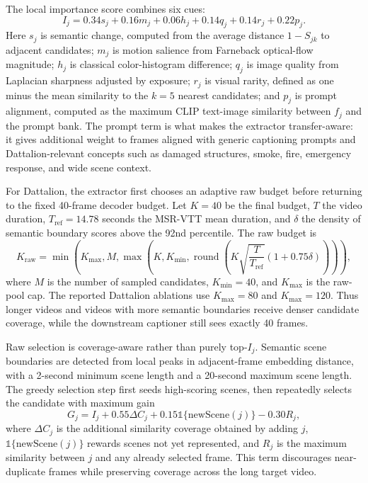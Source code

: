 \documentclass[pdflatex,sn-mathphys-num]{sn-jnl}
\theoremstyle{thmstyleone}
\theoremstyle{thmstyletwo}
\theoremstyle{thmstylethree}
\begin{document}
The local importance score combines six cues:
\[
    I_j =
    0.34s_j + 0.16m_j + 0.06h_j
    + 0.14q_j + 0.14r_j + 0.22p_j .
\]
Here $s_j$ is semantic change, computed from the average distance $1-S_{jk}$ to adjacent candidates; $m_j$ is motion salience from Farneback optical-flow magnitude; $h_j$ is classical color-histogram difference; $q_j$ is image quality from Laplacian sharpness adjusted by exposure; $r_j$ is visual rarity, defined as one minus the mean similarity to the $k=5$ nearest candidates; and $p_j$ is prompt alignment, computed as the maximum CLIP text-image similarity between $f_j$ and the prompt bank. The prompt term is what makes the extractor transfer-aware: it gives additional weight to frames aligned with generic captioning prompts and Dattalion-relevant concepts such as damaged structures, smoke, fire, emergency response, and wide scene context.

For Dattalion, the extractor first chooses an adaptive raw budget before returning to the fixed 40-frame decoder budget. Let $K=40$ be the final budget, $T$ the video duration, $T_{\mathrm{ref}}=14.78$ seconds the MSR-VTT mean duration, and $\delta$ the density of semantic boundary scores above the 92nd percentile. The raw budget is
\[
    K_{\mathrm{raw}} =
    \min\left(
        K_{\max}, M,
        \max\left(K, K_{\min},
        \operatorname{round}\left(K\sqrt{\frac{T}{T_{\mathrm{ref}}}}
        \left(1+0.75\delta\right)\right)\right)
    \right),
\]
where $M$ is the number of sampled candidates, $K_{\min}=40$, and $K_{\max}$ is the raw-pool cap. The reported Dattalion ablations use $K_{\max}=80$ and $K_{\max}=120$. Thus longer videos and videos with more semantic boundaries receive denser candidate coverage, while the downstream captioner still sees exactly 40 frames.

Raw selection is coverage-aware rather than purely top-$I_j$. Semantic scene boundaries are detected from local peaks in adjacent-frame embedding distance, with a 2-second minimum scene length and a 20-second maximum scene length. The greedy selection step first seeds high-scoring scenes, then repeatedly selects the candidate with maximum gain
\[
    G_j =
    I_j + 0.55\Delta C_j + 0.15\mathbb{1}\{\mathrm{newScene}(j)\}
    -0.30R_j ,
\]
where $\Delta C_j$ is the additional similarity coverage obtained by adding $j$, $\mathbb{1}\{\mathrm{newScene}(j)\}$ rewards scenes not yet represented, and $R_j$ is the maximum similarity between $j$ and any already selected frame. This term discourages near-duplicate frames while preserving coverage across the long target video.
\end{document}
